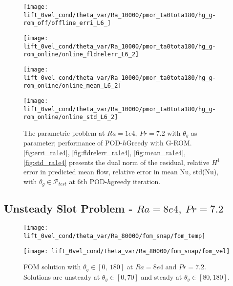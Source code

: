 \begin{figure}[h!]
    \begin{minipage}[b]{.25\linewidth}
        \centering \texttt{[image: lift\_0vel\_cond/theta\_var/Ra\_10000/pmor\_ta0tota180/hg\_g-rom\_off/offline\_erri\_L6\_]}
        \label{fig:erri_ra1e4}
    \end{minipage}%
    \begin{minipage}[b]{.25\linewidth}
        \centering \texttt{[image: lift\_0vel\_cond/theta\_var/Ra\_10000/pmor\_ta0tota180/hg\_g-rom\_online/online\_fldrelerr\_L6\_2]}
        \label{fig:fldrelerr_ra1e4}
    \end{minipage}
    \begin{minipage}[b]{.25\linewidth}
        \centering \texttt{[image: lift\_0vel\_cond/theta\_var/Ra\_10000/pmor\_ta0tota180/hg\_g-rom\_online/online\_mean\_L6\_2]}
        \label{fig:mean_ra1e4}
    \end{minipage}%
    \begin{minipage}[b]{.25\linewidth}
        \centering \texttt{[image: lift\_0vel\_cond/theta\_var/Ra\_10000/pmor\_ta0tota180/hg\_g-rom\_online/online\_std\_L6\_2]}
        \label{fig:std_ra1e4}
    \end{minipage} \caption{The parametric problem at $Ra=1e4,~Pr=7.2$ with $\theta_g$ as
    parameter; performance of POD-$h$Greedy with G-ROM.
    \ref{fig:erri_ra1e4}, \ref{fig:fldrelerr_ra1e4},
    \ref{fig:mean_ra1e4}, \ref{fig:std_ra1e4} presents the dual
    norm of the residual, relative $H^1$ error in predicted mean
    flow, relative error in mean Nu, std(Nu), with $\theta_g \in
    \mathcal{P}_{test}$ at 6th POD-$h$greedy iteration.}
    \label{fig:online_ra1e4} 
\end{figure}
\clearpage
\subsection{Unsteady Slot Problem - $Ra=8e4,~Pr=7.2$}
\begin{figure}[h!]
    \begin{minipage}[b]{.5\linewidth}
   \centering 
   \texttt{[image: lift\_0vel\_cond/theta\_var/Ra\_80000/fom\_snap/fom\_temp]}
    \end{minipage}%
    \begin{minipage}[b]{.5\linewidth}
   \centering 
   \texttt{[image: lift\_0vel\_cond/theta\_var/Ra\_80000/fom\_snap/fom\_vel]}
    \end{minipage} 
    \caption{FOM solution with $\theta_g \in [0,~180]$ at $Ra=8e4$ and
    $Pr=7.2$. Solutions are unsteady at $\theta_g \in [0, 70]$ and steady at
    $\theta_g \in [80, 180]$.}
\label{fig:slot_pr_7.2_fom_sol} \end{figure}
